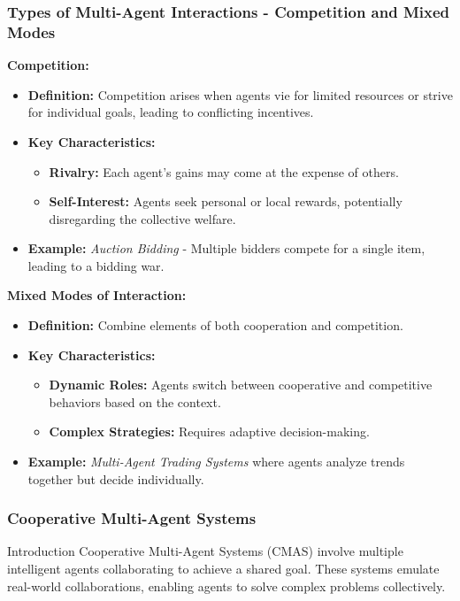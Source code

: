 \documentclass[aspectratio=169]{beamer}
\begin{document}
\begin{frame}[fragile]
    \frametitle{Types of Multi-Agent Interactions - Competition and Mixed Modes}
    \textbf{Competition:}
    \begin{itemize}
        \item \textbf{Definition:} Competition arises when agents vie for limited resources or strive for individual goals, leading to conflicting incentives.
        \item \textbf{Key Characteristics:}
        \begin{itemize}
            \item \textbf{Rivalry:} Each agent's gains may come at the expense of others.
            \item \textbf{Self-Interest:} Agents seek personal or local rewards, potentially disregarding the collective welfare.
        \end{itemize}
        \item \textbf{Example:} \textit{Auction Bidding} - Multiple bidders compete for a single item, leading to a bidding war.
    \end{itemize}

    \vspace{0.5em} %
    \textbf{Mixed Modes of Interaction:}
    \begin{itemize}
        \item \textbf{Definition:} Combine elements of both cooperation and competition.
        \item \textbf{Key Characteristics:}
        \begin{itemize}
            \item \textbf{Dynamic Roles:} Agents switch between cooperative and competitive behaviors based on the context.
            \item \textbf{Complex Strategies:} Requires adaptive decision-making.
        \end{itemize}
        \item \textbf{Example:} \textit{Multi-Agent Trading Systems} where agents analyze trends together but decide individually.
    \end{itemize}
\end{frame}

\begin{frame}[fragile]
    \frametitle{Cooperative Multi-Agent Systems}
    \begin{block}{Introduction}
        Cooperative Multi-Agent Systems (CMAS) involve multiple intelligent agents collaborating to achieve a shared goal.  
        These systems emulate real-world collaborations, enabling agents to solve complex problems collectively.
    \end{block}
\end{frame}
\end{document}

